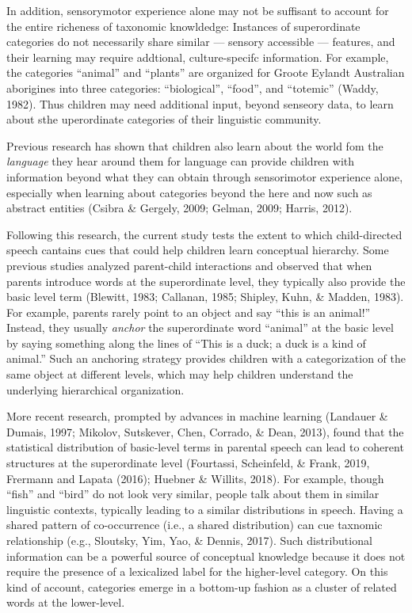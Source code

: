\documentclass[english,,man,floatsintext]{apa6}
\begin{document}
In addition, sensorymotor experience alone may not be suffisant to account for the entire richeness of taxonomic knowldedge: Instances of superordinate categories do not necessarily share similar --- sensory accessible --- features, and their learning may require addtional, culture-specifc information. For example, the categories \enquote{animal} and \enquote{plants} are organized for Groote Eylandt Australian aborigines into three categories: \enquote{biological}, \enquote{food}, and \enquote{totemic} (Waddy, 1982). Thus children may need additional input, beyond senseory data, to learn about sthe uperordinate categories of their linguistic community.

Previous research has shown that children also learn about the world fom the \emph{language} they hear around them for language can provide children with information beyond what they can obtain through sensorimotor experience alone, especially when learning about categories beyond the here and now such as abstract entities (Csibra \& Gergely, 2009; Gelman, 2009; Harris, 2012).

Following this research, the current study tests the extent to which child-directed speech cantains cues that could help children learn conceptual hierarchy. Some previous studies analyzed parent-child interactions and observed that when parents introduce words at the superordinate level, they typically also provide the basic level term (Blewitt, 1983; Callanan, 1985; Shipley, Kuhn, \& Madden, 1983). For example, parents rarely point to an object and say \enquote{this is an animal!} Instead, they usually \emph{anchor} the superordinate word \enquote{animal} at the basic level by saying something along the lines of \enquote{This is a duck; a duck is a kind of animal.} Such an anchoring strategy provides children with a categorization of the same object at different levels, which may help children understand the underlying hierarchical organization.

More recent research, prompted by advances in machine learning (Landauer \& Dumais, 1997; Mikolov, Sutskever, Chen, Corrado, \& Dean, 2013), found that the statistical distribution of basic-level terms in parental speech can lead to coherent structures at the superordinate level (Fourtassi, Scheinfeld, \& Frank, 2019, Frermann and Lapata (2016); Huebner \& Willits, 2018). For example, though \enquote{fish} and \enquote{bird} do not look very similar, people talk about them in similar linguistic contexts, typically leading to a similar distributions in speech. Having a shared pattern of co-occurrence (i.e., a shared distribution) can cue taxnomic relationship (e.g., Sloutsky, Yim, Yao, \& Dennis, 2017). Such distributional information can be a powerful source of conceptual knowledge because it does not require the presence of a lexicalized label for the higher-level category. On this kind of account, categories emerge in a bottom-up fashion as a cluster of related words at the lower-level.
\end{document}
